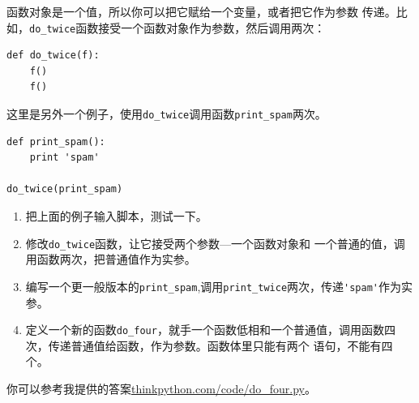 \begin{ex}

函数对象是一个值，所以你可以把它赋给一个变量，或者把它作为参数
传递。比如，\verb"do_twice"函数接受一个函数对象作为参数，然后调用两次：

\beforeverb
\begin{verbatim}
def do_twice(f):
    f()
    f()
\end{verbatim}
\afterverb

这里是另外一个例子，使用\verb"do_twice"调用函数\verb"print_spam"两次。

\beforeverb
\begin{verbatim}
def print_spam():
    print 'spam'

do_twice(print_spam)
\end{verbatim}
\afterverb

\begin{enumerate}

\item 把上面的例子输入脚本，测试一下。

\item 修改\verb"do_twice"函数，让它接受两个参数---一个函数对象和
一个普通的值，调用函数两次，把普通值作为实参。

\item 编写一个更一般版本的\verb"print_spam",调用\verb"print_twice"两次，传递\verb"'spam'"作为实参。

\item 定义一个新的函数\verb"do_four"，就手一个函数低相和一个普通值，调用函数四次，传递普通值给函数，作为参数。函数体里只能有两个
语句，不能有四个。

\end{enumerate}

你可以参考我提供的答案\url{thinkpython.com/code/do_four.py}。

\end{ex}


